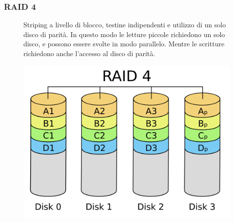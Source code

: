 \subsubsection*{RAID 4}
\begin{figure}[H]
    \centering
    \begin{minipage}{0.65\textwidth}
        Striping a livello di blocco, testine indipendenti e utilizzo di un solo disco di parità.
        In questo modo le letture piccole richiedono un solo disco, e possono essere svolte in modo parallelo. Mentre le scritture richiedono anche l'accesso al disco di parità.
    \end{minipage}
    \hfill
    \begin{minipage}{0.3\textwidth}
        \centering
        \includegraphics[width=1\linewidth]{assets/RAID_4.png}
    \end{minipage}
\end{figure}


